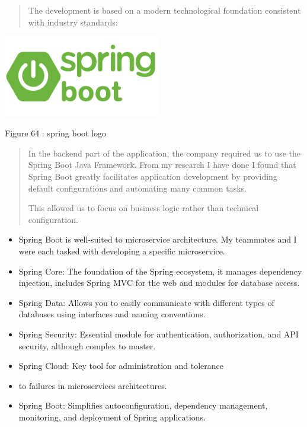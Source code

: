\documentclass[12pt,a4paper]{report}
\begin{document}
\begin{quote}
The development is based on a modern technological foundation consistent
with industry standards:
\end{quote}

\includegraphics[width=2.69689in,height=1.41094in]{vertopal_d1b0b2209edd4c6aa8254f57daa0953b/media/image83.png}

\protect\hypertarget{_Toc201954540}{}{}Figure 64 : spring boot logo

\begin{quote}
In the backend part of the application, the company required us to use
the Spring Boot Java Framework. From my research I have done I found
that Spring Boot greatly facilitates application development by
providing default configurations and automating many common tasks.

This allowed us to focus on business logic rather than technical
configuration.
\end{quote}

\begin{itemize}
\item
  Spring Boot is well-suited to microservice architecture. My teammates
  and I were each tasked with developing a specific microservice.
\item
  Spring Core: The foundation of the Spring ecosystem, it manages
  dependency injection, includes Spring MVC for the web and modules for
  database access.
\item
  Spring Data: Allows you to easily communicate with different types of
  databases using interfaces and naming conventions.
\item
  Spring Security: Essential module for authentication, authorization,
  and API security, although complex to master.
\item
  Spring Cloud: Key tool for administration and tolerance
\item
  to failures in microservices architectures.
\item
  Spring Boot: Simplifies autoconfiguration, dependency management,
  monitoring, and deployment of Spring applications.
\end{itemize}
\end{document}
